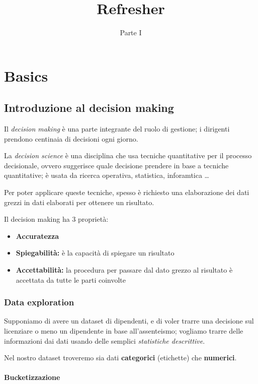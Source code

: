 \documentclass{report}
\title{\huge\textbf{{Refresher}}}
\date{Parte I}
\begin{document}
\maketitle
\tableofcontents
\newpage


\chapter{Basics}

\section{Introduzione al decision making}

Il \textit{decision making} è una parte integrante del ruolo di gestione; i dirigenti prendono centinaia di decisioni ogni giorno.

\noindent La \textit{decision science} è una disciplina che usa tecniche quantitative per il processo decisionale, ovvero suggerisce quale 
decisione prendere in base a tecniche quantitative; è usata da ricerca operativa, statistica, inforamtica \dots

\noindent Per poter applicare queste tecniche, spesso è richiesto una elaborazione dei dati grezzi in dati elaborati per ottenere un risultato.

\noindent Il decision making ha 3 proprietà:
\begin{itemize}
    \item \textbf{Accuratezza}
    \item \textbf{Spiegabilità:} è la capacità di spiegare un risultato 
    \item \textbf{Accettabilità:} la procedura per passare dal dato grezzo al risultato è accettata da tutte le parti coinvolte
\end{itemize}

\subsection{Data exploration}
Supponiamo di avere un dataset di dipendenti, e di voler trarre una decisione sul licenziare o meno un dipendente in base all'assenteismo; vogliamo 
trarre delle informazioni dai dati usando delle semplici \textit{statistiche descrittive}. 

\noindent Nel nostro dataset troveremo sia dati \textbf{categorici} (etichette) che \textbf{numerici}.

\subsubsection{Bucketizzazione}
\end{document}
